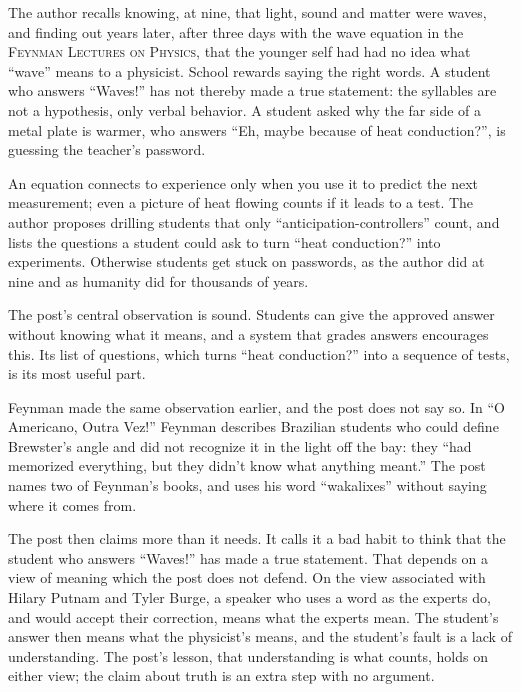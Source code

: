 \begin{afterword}
\summaryhead

The author recalls knowing, at nine, that light, sound and matter were waves, and finding out years later, after three days with the wave equation in the \textsc{Feynman Lectures on Physics}, that the younger self had had no idea what ``wave'' means to a physicist. School rewards saying the right words. A student who answers ``Waves!'' has not thereby made a true statement: the syllables are not a hypothesis, only verbal behavior. A student asked why the far side of a metal plate is warmer, who answers ``Eh, maybe because of heat conduction?'', is guessing the teacher's password.

An equation connects to experience only when you use it to predict the next measurement; even a picture of heat flowing counts if it leads to a test. The author proposes drilling students that only ``anticipation-controllers'' count, and lists the questions a student could ask to turn ``heat conduction?'' into experiments. Otherwise students get stuck on passwords, as the author did at nine and as humanity did for thousands of years.

\responsehead

The post's central observation is sound. Students can give the approved answer without knowing what it means, and a system that grades answers encourages this. Its list of questions, which turns ``heat conduction?'' into a sequence of tests, is its most useful part.

Feynman made the same observation earlier, and the post does not say so. In ``O Americano, Outra Vez!'' Feynman describes Brazilian students who could define Brewster's angle and did not recognize it in the light off the bay: they ``had memorized everything, but they didn't know what anything meant.'' The post names two of Feynman's books, and uses his word ``wakalixes'' without saying where it comes from.

The post then claims more than it needs. It calls it a bad habit to think that the student who answers ``Waves!'' has made a true statement. That depends on a view of meaning which the post does not defend. On the view associated with Hilary Putnam and Tyler Burge, a speaker who uses a word as the experts do, and would accept their correction, means what the experts mean. The student's answer then means what the physicist's means, and the student's fault is a lack of understanding. The post's lesson, that understanding is what counts, holds on either view; the claim about truth is an extra step with no argument.


\end{afterword}
